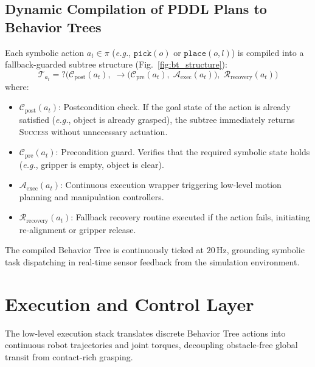 \documentclass[conference]{IEEEtran}
\begin{document}
\subsection{Dynamic Compilation of PDDL Plans to Behavior Trees}
Each symbolic action $a_t \in \pi$ (\textit{e.g.}, $\texttt{pick}(o)$ or $\texttt{place}(o, l)$) is compiled into a fallback-guarded subtree structure (Fig.~\ref{fig:bt_structure}):
\begin{equation}
    \mathcal{T}_{a_t} = \boldsymbol{?} \Big( \mathcal{C}_{\text{post}}(a_t),\; \boldsymbol{\rightarrow} \big( \mathcal{C}_{\text{pre}}(a_t),\; \mathcal{A}_{\text{exec}}(a_t) \big),\; \mathcal{R}_{\text{recovery}}(a_t) \Big)
\end{equation}
where:
\begin{itemize}
    \item $\mathcal{C}_{\text{post}}(a_t)$: Postcondition check. If the goal state of the action is already satisfied (\textit{e.g.}, object is already grasped), the subtree immediately returns \textsc{Success} without unnecessary actuation.
    \item $\mathcal{C}_{\text{pre}}(a_t)$: Precondition guard. Verifies that the required symbolic state holds (\textit{e.g.}, gripper is empty, object is clear).
    \item $\mathcal{A}_{\text{exec}}(a_t)$: Continuous execution wrapper triggering low-level motion planning and manipulation controllers.
    \item $\mathcal{R}_{\text{recovery}}(a_t)$: Fallback recovery routine executed if the action fails, initiating re-alignment or gripper release.
\end{itemize}

The compiled Behavior Tree is continuously ticked at $20$\,Hz, grounding symbolic task dispatching in real-time sensor feedback from the simulation environment.

\section{Execution and Control Layer}
\label{sec:execution_control_layer}

The low-level execution stack translates discrete Behavior Tree actions into continuous robot trajectories and joint torques, decoupling obstacle-free global transit from contact-rich grasping.
\end{document}
